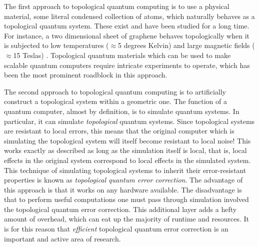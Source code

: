 \documentclass{article}
\theoremstyle{definition}
\newcommand{\0}{\left|0\right>}
\newcommand{\1}{\left|1\right>}
\numberwithin{figure}{section}
\begin{document}
The first approach to topological quantum computing is to use a physical material, some literal condensed collection of atoms, which naturally behaves as a topological quantum system. These exist and have been studied for a long time. For instance, a two dimensional sheet of graphene behaves topologically when it is subjected to low temperatures ($\approx$5 degrees Kelvin) and large magnetic fields ($\approx$15 Teslas) \cite{bolotin2009observation}. Topological quantum materials which can be used to make scalable quantum computers require intricate experiments to operate, which has been the most prominent roadblock in this approach.

The second approach to topological quantum computing is to artificially construct a topological system within a geometric one. The function of a quantum computer, almost by definition, is to simulate quantum systems. In particular, it can simulate \textit{topological} quantum systems. Since topological systems are resistant to local errors, this means that the original computer which is simulating the topological system will itself become resistant to local noise! This works exactly as described as long as the simulation itself is local, that is, local effects in the original system correspond to local effects in the simulated system. This technique of simulating topological systems to inherit their error-resistant properties is known as \textit{topological quantum error correction}. The advantage of this approach is that it works on any hardware available. The disadvantage is that to perform useful computations one must pass through simulation involved the topological quantum error correction. This additional layer adds a hefty amount of overhead, which can eat up the majority of runtime and resources. It is for this reason that \textit{efficient} topological quantum error correction is an important and active area of research.
\end{document}
